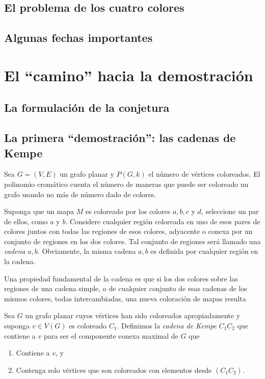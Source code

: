 \documentclass[3p,times,a4paper,twocolumn,authoryear]{elsarticle} %
\begin{document}
\subsection{El problema de los cuatro colores}

\subsection{Algunas fechas importantes}

\section{El ``camino'' hacia la demostración}

\subsection{La formulación de la conjetura}

\subsection{La primera ``demostración'': las cadenas de Kempe}

\begin{definition}
Sea $G=(V,E)$ un grafo planar y $P(G,k)$ el número de vértices coloreados.
El polinomio cromático cuenta el número de maneras que puede ser coloreado un grafo usando no más de número dado de colores.
\end{definition}

\begin{definition}
Suponga que un mapa $M$ es coloreado por los colores $a, b, c$ y $d$, seleccione un par de ellos, como $a$ y $b$. Considere cualquier región coloreada en uno de esos pares de colores juntos con todas las regiones de esos colores, adyacente o conexa por un conjunto de regiones en los dos colores. Tal conjunto de regiones será llamado una \emph{cadena} $a,b$. Obviamente, la misma cadena $a,b$ es definida por cualquier región en la cadena.

Una propiedad fundamental de la cadena es que si los dos colores sobre las regiones de una cadena simple, o de cualquier conjunto de esas cadenas de los mismos colores, todas intercambiadas, una nueva coloración de mapas resulta
\end{definition}

\begin{definition}
Sea $G$ un grafo planar cuyos vértices han sido coloreados apropiadamente y suponga $v\in V(G)$ es coloreado $C_1$. Definimos la \emph{cadena de Kempe} $C_1C_2$ que contiene a $v$ para ser el componente conexa maximal de $G$ que

\begin{enumerate}%
	\item Contiene a $v$, y
	\item Contenga solo vértices que son coloreados con elementos desde $(C_1C_2)$.
	\end{enumerate}
\end{definition}
\end{document}
